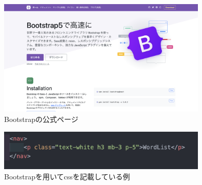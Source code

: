 \documentclass[11pt,a4paper]{jsarticle}
\begin{document}
\begin{figure}[htbp]
    \begin{center}
        \includegraphics[width=100mm]{./img/bootstrap.png}
    \end{center}
    \caption{Bootstrapの公式ページ}
\end{figure}

\begin{figure}[htbp]
    \begin{center}
        \includegraphics[width=100mm]{./img/ptag.png}
    \end{center}
    \caption{Bootstrapを用いてcssを記載している例}
\end{figure}
\end{document}
